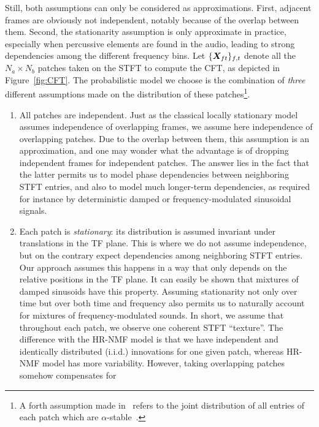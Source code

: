 Still, both assumptions can only be considered as approximations.
First, adjacent frames are obviously not independent, notably because
of the overlap between them. Second, the stationarity assumption is
only approximate in practice, especially when percussive elements are
found in the audio, leading to strong dependencies among the different
frequency bins. Let $\{ {\bm{X}}_{ft}\} _{f,t}$
denote all the $N_{a}\times N_{b}$ patches taken on the STFT to compute
the CFT, as depicted in Figure~\ref{fig:CFT}. The probabilistic
model we choose is the combination of \emph{three} different assumptions
made on the distribution of these patches\footnote{A forth assumption made in~\cite{stoeter16} refers to the joint distribution of all entries of each patch which are $\alpha$-stable~\cite{samoradnitsky94}.}.

\begin{enumerate}[leftmargin=0cm,itemindent=.5cm,labelwidth=\itemindent,labelsep=0cm,align=left]
\item All patches are independent. 
Just as the classical locally stationary
model~\cite{liutkus11t} assumes independence of overlapping frames,
we assume here independence of overlapping patches. Due to the
overlap between them, this assumption is an approximation,
and one may wonder what the advantage is of dropping independent frames
for independent patches. 
The answer lies in the fact that the latter permits us to model phase dependencies between neighboring STFT entries, and also to model much longer-term dependencies, as required for instance by deterministic damped or frequency-modulated sinusoidal signals.\label{enu:assumption_independent_patches}
\item Each patch is \emph{stationary}: its distribution
is assumed invariant under translations in the TF plane. This is where we do not assume independence, but on the contrary expect dependencies among neighboring STFT entries. Our approach assumes this happens in a way that only depends on the relative positions in
the TF plane. It can easily be shown that mixtures of
damped sinusoids have this property. Assuming stationarity not only over time but over both time and frequency
also permits us to naturally account for mixtures of frequency-modulated
sounds. In short, we assume that throughout each patch, we observe
one coherent STFT ``texture''. The difference with the HR-NMF model is that we have independent and identically
distributed (i.i.d.) innovations for one given patch, whereas HR-NMF model has more variability. 
However, taking overlapping patches somehow compensates for

\end{enumerate}
